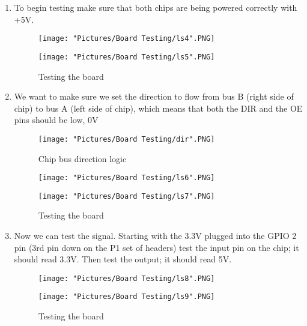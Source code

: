 \documentclass[12pt]{article}
\begin{document}
\begin{enumerate}
	\item To begin testing make sure that both chips are being powered correctly with +5V.
	
\begin{figure}[H]
 	\centering
  	\begin{minipage}[b]{0.45\textwidth}
		\texttt{[image: "Pictures/Board Testing/ls4".PNG]}
  	\end{minipage}
  	\hfill
  	\begin{minipage}[b]{0.45\textwidth}
    		\texttt{[image: "Pictures/Board Testing/ls5".PNG]}
  	\end{minipage}
	\caption{Testing the board}
\end{figure}

	\item We want to make sure we set the direction to flow from bus B (right side of chip) to bus A (left side of chip), which means that both the DIR and the OE pins should be low, 0V

\begin{figure}[H]
  	\centering
    	\texttt{[image: "Pictures/Board Testing/dir".PNG]}
 	\caption{Chip bus direction logic}
	\label{dir}
\end{figure}

\begin{figure}[H]
 	\centering
  	\begin{minipage}[b]{0.45\textwidth}
		\texttt{[image: "Pictures/Board Testing/ls6".PNG]}
  	\end{minipage}
  	\hfill
  	\begin{minipage}[b]{0.45\textwidth}
    		\texttt{[image: "Pictures/Board Testing/ls7".PNG]}
  	\end{minipage}
	\caption{Testing the board}
\end{figure}

	\item Now we can test the signal. Starting with the 3.3V plugged into the GPIO 2 pin (3rd pin down on the P1 set of headers) test the input pin on the chip; it should read 3.3V. Then test the output; it should read 5V.

\begin{figure}[H]
 	\centering
  	\begin{minipage}[b]{0.45\textwidth}
		\texttt{[image: "Pictures/Board Testing/ls8".PNG]}
  	\end{minipage}
  	\hfill
  	\begin{minipage}[b]{0.45\textwidth}
    		\texttt{[image: "Pictures/Board Testing/ls9".PNG]}
  	\end{minipage}
	\caption{Testing the board}
	\label{ls2}
\end{figure}


\end{enumerate}
\end{document}
